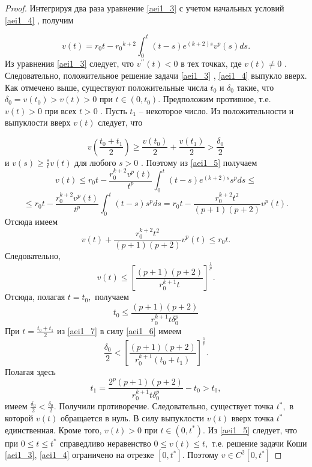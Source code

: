 \begin{proof}
 
Интегрируя два раза уравнение \eqref{aei1_3} 
 с учетом начальных условий \eqref{aei1_4} , получим

\begin{equation}\label{aei1_5}
v(t)=r_0t-{r_0}^{k+2} \int_0^t(t-s)e^{(k+2)s}v^p(s)ds.
\end{equation}
Из уравнения \eqref{aei1_3}  следует, что $ v^{\prime\prime}(t)<0 $ в тех
точках, где $ v(t) \neq 0 $ . 
Следовательно, положительное решение
задачи \eqref{aei1_3} , \eqref{aei1_4}  выпукло вверх. Как отмечено выше, существуют
положительные числа $ t_0 $ и $ \delta_0 $ такие, что $
\delta_0=v(t_0)>v(t)>0 $  при $ t \in (0,t_0)$. Предположим
противное, т.е. $ v(t)>0 $  при всех $ t>0 $ . Пусть $ t_1$ --
некоторое число. Из положительности и выпуклости вверх $ v(t) $
следует, что

\begin{equation}\label{aei1_6}
 v\left(\frac{t_0+t_1}{2}\right)
\geq \frac{v(t_0)}{2}+\frac{v(t_1)}{2}>\frac{\delta_0}{2} 
\end{equation}
и $ v(s) \geq \frac {s}{t}v(t) $ для любого $ s>0 $ .
Поэтому из \eqref{aei1_5} получаем
$$
v(t) \leq r_0t-\frac{r_0^{k+2}v^p(t)}{t^p}
\int_0^t(t-s)e^{(k+2)s}s^pds \leq
$$
$$
 \leq r_0t-\frac{r_0^{k+2}v^p(t)}{t^p}
 \int_0^t(t-s)s^pds=
  r_0t-\frac{r_0^{k+2}t^2}{(p+1)(p+2)}v^p(t).
$$
Отсюда имеем
$$
v(t)+\frac{r_0^{k+2}t^2}{(p+1)(p+2)}v^p(t) \leq r_0t.
$$
Следовательно,
\begin{equation}\label{aei1_7}
v(t)
\leq {\left [\frac {(p+1)(p+2)}{r_0^{k+1}t}\right ]}^
{\frac{1}{p}}.   
\end{equation}
Отсюда, полагая $ t=t_0,  $ получаем
$$
t_0 \leq \frac {(p+1)(p+2)}{r_0^{k+1}t\delta_0^p}
$$
При $ t=\frac{t_0+t_1}{2} $ из \eqref{aei1_7} в силу \eqref{aei1_6} имеем
$$
\frac {\delta_0}{2}<
{\left [\frac {(p+1)(p+2)}{r_0^{k+1}(t_0+t_1)}\right ]}^
{\frac{1}{p}}.
$$
Полагая здесь
$$
t_1=\frac {2^p(p+1)(p+2)}{r_0^{k+1}t\delta_0^p}-t_0>t_0,
$$
имеем $ \frac{\delta_0}{2}<\frac{\delta_0}{2}$. 
Получили противоречие. Следовательно, существует точка $ t^*, $
в которой $ v(t) $ обращается в нуль. В силу выпуклости
$ v(t) $  вверх точка $ t^* $  единственная. Кроме того,
$ v(t)>0 $   при $ t \in (0, t^*) $. Из \eqref{aei1_5} следует, что
 при $ 0 \leq t \leq t^* $  справедливо неравенство
$ 0 \leq v(t) \leq t, $ т.е. решение задачи Коши \eqref{aei1_3}, \eqref{aei1_4}
ограничено на отрезке $ [0, t^*] $. Поэтому $ v \in C^2[0, t^*]$
\end{proof}

